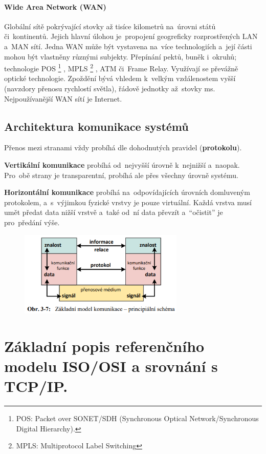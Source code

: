 \paragraph{Wide Area Network (WAN)} Globální sítě pokrývající stovky až tisíce kilometrů na~úrovni států či~kontinentů. Jejich hlavní úlohou je~propojení geogreficky rozprostřených LAN a~MAN sítí. Jedna WAN může být vystavena na~více technologiích a~její části mohou být vlastněny různými subjekty. Přepínání pektů, buněk i~okruhů; technologie POS%
\footnote{POS: Packet over SONET/SDH (Synchronous Optical Network/Synchronous Digital Hierarchy).}%
, MPLS%
\footnote{MPLS: Multiprotocol Label Switching}%
, ATM či~Frame Relay. Využívají se převážně optické technologie. Zpoždění bývá vhledem k~velkým vzdálenostem vyšší (navzdory přenosu rychlostí světla), řádově jednotky až~stovky ms. Nejpoužívanější WAN sítí je Internet.

\subsection{Architektura komunikace systémů}

Přenos mezi stranami vždy probíhá dle dohodnutých pravidel (\textbf{protokolu}).

\textbf{Vertikální komunikace} probíhá od~nejvyšší úrovně k~nejnižší a~naopak. Pro~obě strany je transparentní, probíhá ale přes všechny úrovně systému.

\textbf{Horizontální komunikace} probíhá na~odpovídajících úrovních domluveným protokolem, a~s~výjimkou fyzické vrstvy je pouze virtuální. Každá vrstva musí umět předat data nižší vrstvě a~také od~ní data převzít a~\enquote{očistit} je pro~předání výše.

\begin{figure}[ht]
	\centering
	\includegraphics[width=0.7\textwidth]{images/q01_communication_architecture}
\end{figure}

\clearpage
\section{Základní popis referenčního modelu ISO/OSI a srovnání s TCP/IP.}


